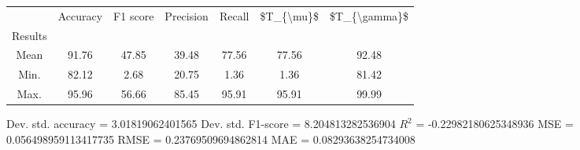 \begin{tabular}{|c|c|c|c|c|c|c|}
\toprule
{} &  Accuracy &  F1 score &  Precision &  Recall &  \$T\_\{\textbackslash mu\}\$ &  \$T\_\{\textbackslash gamma\}\$ \\
Results &           &           &            &         &            &               \\
\hline
Mean    &     91.76 &     47.85 &      39.48 &   77.56 &      77.56 &         92.48 \\
Min.    &     82.12 &      2.68 &      20.75 &    1.36 &       1.36 &         81.42 \\
Max.    &     95.96 &     56.66 &      85.45 &   95.91 &      95.91 &         99.99 \\
\bottomrule
\end{tabular}

 Dev. std. accuracy = 3.01819062401565
 Dev. std. F1-score = 8.204813282536904
 $R^2$ = -0.22982180625348936
 MSE = 0.056498959113417735
 RMSE = 0.23769509694862814
 MAE = 0.08293638254734008